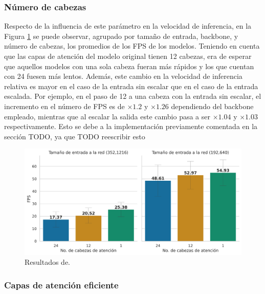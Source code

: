 \subsubsection{Número de cabezas}


Respecto de la influencia de este parámetro en la velocidad de inferencia, en la Figura \ref{fig:resultados-inf-num-cabezas} se puede observar, agrupado por tamaño de entrada, backbone, y número de cabezas, los promedios de los FPS de los modelos. Teniendo en cuenta que las capas de atención del modelo original tienen 12 cabezas, era de esperar que aquellos modelos con una sola cabeza fueran más rápidos y los que cuentan con 24 fuesen más lentos. Además, este cambio en la velocidad de inferencia relativa es mayor en el caso de la entrada sin escalar que en el caso de la entrada escalada. Por ejemplo, en el paso de 12 a una cabeza con la entrada sin escalar, el incremento en el número de FPS es de $\times1.2$ y $\times1.26$ dependiendo del backbone empleado, mientras que al escalar la salida este cambio pasa a ser $\times1.04$ y $\times1.03$ respectivamente. Esto se debe a la implementación previamente comentada en la sección TODO, ya que TODO reescribir esto
\begin{figure}[H]
\centering
\includegraphics[width=0.9\linewidth]{imagenes/Resultados/velocidad_inferencia_cabezas_atencion.png} 
\captionsetup{width=.8\linewidth}
\caption{Resultados de.}
\label{fig:resultados-inf-num-cabezas}
\end{figure}

\subsubsection{Capas de atención eficiente}


